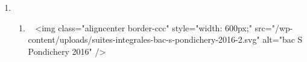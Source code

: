 \begin{corrige}
\begin{enumerate}
\begin{enumerate}[label=\alph*.]
$$               \item
               Comme $f$ est strictement croissante sur $[0~;~+ \infty[$ :
               \par
               $t \geqslant 10 \Rightarrow f(t) \geqslant f(10)$
               \par
               Or :
               \par
               $f(10)=100-75{e}^{- \frac{\ln 5}{10} \times 10}$
               \par
               $\phantom{f(10)}=100-75{e}^{-\ln 5}$
               \par
               $\phantom{f(10)}=100-\frac{75}{{e}^{\ln 5}}$
               \par
               $\phantom{f(10)}=100-\frac{75}{5}=85$
               \par
               Donc pour tout $t \in [0~;~+ \infty[$, $f(t) \geqslant 85$.
          \end{enumerate}
          \item
          \begin{enumerate}
               \item
               ~
               <img class="aligncenter border-ccc" style="width: 600px;" src="/wp-content/uploads/suites-integrales-bac-s-pondichery-2016-2.svg" alt="bac S Pondichery 2016" />


\end{enumerate}
\end{enumerate}
\end{corrige}
